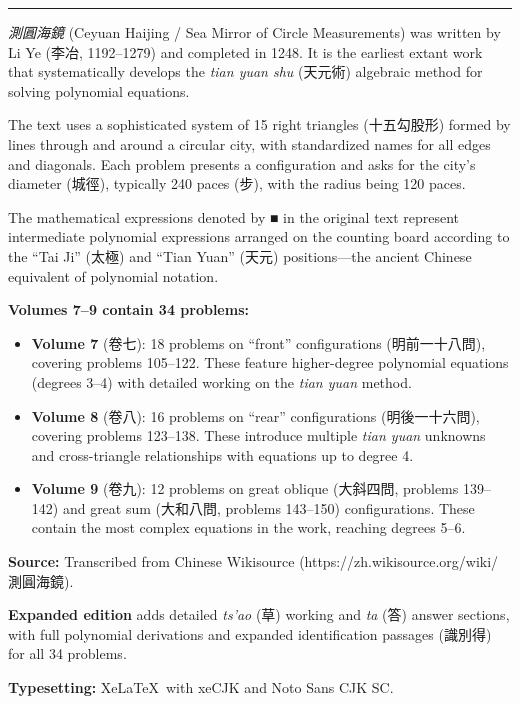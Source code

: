 \documentclass[11pt,a4paper]{article}
\newcommand{\longline}{\noindent\rule{\textwidth}{0.4pt}}
\begin{document}
\begin{center}
\longline
\end{center}

\textit{測圓海鏡} (Ceyuan Haijing / Sea Mirror of Circle Measurements) was written by
Li Ye (李冶, 1192--1279) and completed in 1248. It is the earliest extant work
that systematically develops the \textit{tian yuan shu} (天元術) algebraic method
for solving polynomial equations.

The text uses a sophisticated system of 15 right triangles (十五勾股形) formed by
lines through and around a circular city, with standardized names for all edges
and diagonals. Each problem presents a configuration and asks for the city's
diameter (城徑), typically 240 paces (步), with the radius being 120 paces.

The mathematical expressions denoted by ■ in the original text represent
intermediate polynomial expressions arranged on the counting board according
to the ``Tai Ji'' (太極) and ``Tian Yuan'' (天元) positions---the ancient Chinese
equivalent of polynomial notation.

\textbf{Volumes 7--9 contain 34 problems:}
\begin{itemize}[leftmargin=2em]
  \item \textbf{Volume 7} (卷七): 18 problems on ``front'' configurations (明前一十八問),
    covering problems 105--122. These feature higher-degree polynomial equations
    (degrees 3--4) with detailed working on the \textit{tian yuan} method.
  \item \textbf{Volume 8} (卷八): 16 problems on ``rear'' configurations (明後一十六問),
    covering problems 123--138. These introduce multiple \textit{tian yuan} unknowns
    and cross-triangle relationships with equations up to degree 4.
  \item \textbf{Volume 9} (卷九): 12 problems on great oblique (大斜四問, problems 139--142)
    and great sum (大和八問, problems 143--150) configurations. These contain the
    most complex equations in the work, reaching degrees 5--6.
\end{itemize}

\vspace{0.5cm}
\textbf{Source:} Transcribed from Chinese Wikisource
(https://zh.wikisource.org/wiki/測圓海鏡).

\textbf{Expanded edition} adds detailed \textit{ts'ao} (草) working and \textit{ta} (答)
answer sections, with full polynomial derivations and expanded identification
passages (識別得) for all 34 problems.

\textbf{Typesetting:} Xe\LaTeX\ with xeCJK and Noto Sans CJK SC.
\end{document}
